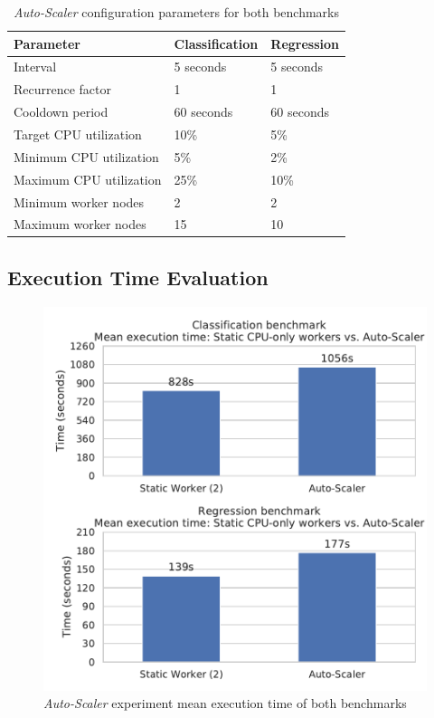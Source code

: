 \begin{table}[ht]
\centering
\begin{tabular}{@{}l|ll@{}}
\toprule
Parameter               & Classification & Regression \\ \midrule
Interval                & 5 seconds      & 5 seconds  \\
Recurrence factor       & 1              & 1          \\
Cooldown period         & 60 seconds     & 60 seconds \\
Target CPU utilization  & 10\%           & 5\%        \\
Minimum CPU utilization & 5\%           & 2\%       \\
Maximum CPU utilization & 25\%           & 10\%       \\
Minimum worker nodes    & 2              & 2         \\
Maximum worker nodes    & 15              & 10         \\ \bottomrule
\end{tabular}
\caption{\textit{Auto-Scaler} configuration parameters for both benchmarks}
\label{table:07_auto-scaler_config_parameter}
\end{table}


\subsection{Execution Time Evaluation}
\begin{figure}[h]
\centering
\includegraphics[scale=0.9]{images/07_evaluation/overall_auto-scaler}
\caption{\textit{Auto-Scaler} experiment mean execution time of both benchmarks}
\label{fig:07_auto-scaler_results}
\end{figure}

